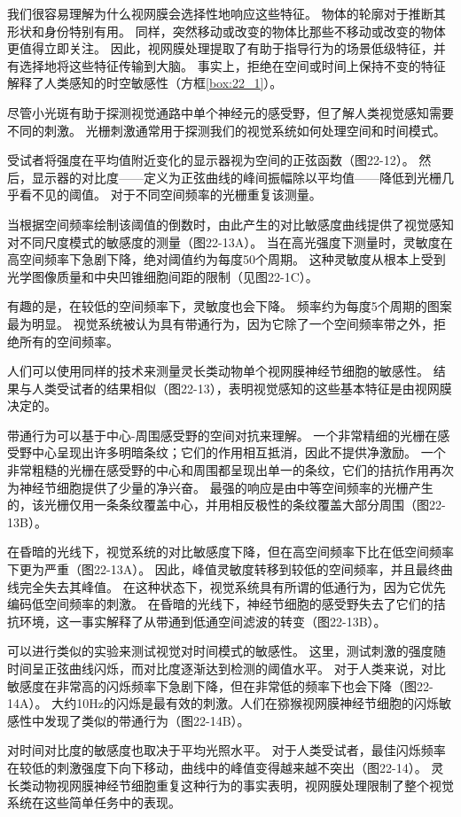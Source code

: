 我们很容易理解为什么视网膜会选择性地响应这些特征。 
物体的轮廓对于推断其形状和身份特别有用。
同样，突然移动或改变的物体比那些不移动或改变的物体更值得立即关注。
因此，视网膜处理提取了有助于指导行为的场景低级特征，并有选择地将这些特征传输到大脑。
事实上，拒绝在空间或时间上保持不变的特征解释了人类感知的时空敏感性（方框\ref{box:22_1}）。


\begin{proposition}[人类感知的时空敏感性] \label{box:22_1}
	
	\quad \quad 尽管小光斑有助于探测视觉通路中单个神经元的感受野，但了解人类视觉感知需要不同的刺激。
	光栅刺激通常用于探测我们的视觉系统如何处理空间和时间模式。
	
	\quad \quad 受试者将强度在平均值附近变化的显示器视为空间的正弦函数（图22-12）。
	然后，显示器的对比度——定义为正弦曲线的峰间振幅除以平均值——降低到光栅几乎看不见的阈值。
	对于不同空间频率的光栅重复该测量。
	
	\quad \quad 当根据空间频率绘制该阈值的倒数时，由此产生的对比敏感度曲线提供了视觉感知对不同尺度模式的敏感度的测量（图22-13A）。
	当在高光强度下测量时，灵敏度在高空间频率下急剧下降，绝对阈值约为每度50个周期。
	这种灵敏度从根本上受到光学图像质量和中央凹锥细胞间距的限制（见图22-1C）。
	
	\quad \quad 有趣的是，在较低的空间频率下，灵敏度也会下降。
	频率约为每度5个周期的图案最为明显。
	视觉系统被认为具有带通行为，因为它除了一个空间频率带之外，拒绝所有的空间频率。
	
	\quad \quad 人们可以使用同样的技术来测量灵长类动物单个视网膜神经节细胞的敏感性。
	结果与人类受试者的结果相似（图22-13），表明视觉感知的这些基本特征是由视网膜决定的。
	
	\quad \quad 带通行为可以基于中心-周围感受野的空间对抗来理解。
	一个非常精细的光栅在感受野中心呈现出许多明暗条纹；它们的作用相互抵消，因此不提供净激励。
	一个非常粗糙的光栅在感受野的中心和周围都呈现出单一的条纹，它们的拮抗作用再次为神经节细胞提供了少量的净兴奋。
	最强的响应是由中等空间频率的光栅产生的，该光栅仅用一条条纹覆盖中心，并用相反极性的条纹覆盖大部分周围（图22-13B）。
	
	\quad \quad 在昏暗的光线下，视觉系统的对比敏感度下降，但在高空间频率下比在低空间频率下更为严重（图22-13A）。
	因此，峰值灵敏度转移到较低的空间频率，并且最终曲线完全失去其峰值。
	在这种状态下，视觉系统具有所谓的低通行为，因为它优先编码低空间频率的刺激。
	在昏暗的光线下，神经节细胞的感受野失去了它们的拮抗环境，这一事实解释了从带通到低通空间滤波的转变（图22-13B）。
	
	\quad \quad 可以进行类似的实验来测试视觉对时间模式的敏感性。
	这里，测试刺激的强度随时间呈正弦曲线闪烁，而对比度逐渐达到检测的阈值水平。
	对于人类来说，对比敏感度在非常高的闪烁频率下急剧下降，但在非常低的频率下也会下降（图22-14A）。
	大约10Hz的闪烁是最有效的刺激。人们在猕猴视网膜神经节细胞的闪烁敏感性中发现了类似的带通行为（图22-14B）。
	
	\quad \quad 对时间对比度的敏感度也取决于平均光照水平。
	对于人类受试者，最佳闪烁频率在较低的刺激强度下向下移动，曲线中的峰值变得越来越不突出（图22-14）。
	灵长类动物视网膜神经节细胞重复这种行为的事实表明，视网膜处理限制了整个视觉系统在这些简单任务中的表现。
	
\end{proposition}




